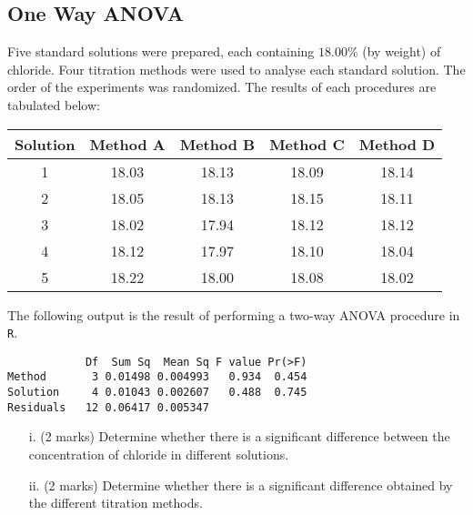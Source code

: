 \subsection{One Way ANOVA}
Five standard solutions were prepared, each containing $18.00\%$ (by weight) of chloride. Four titration methods were used to analyse each standard solution. The order of the experiments was randomized. The results of each procedures are tabulated below:
\begin{center}
    \begin{tabular}{|c|c|c|c|c|}
      \hline

      Solution &  Method A & Method B & Method C & Method D \\\hline
1	&	18.03	&	18.13	&	18.09	&	18.14	\\
2	&	18.05	&	18.13	&	18.15	&	18.11	\\
3	&	18.02	&	17.94	&	18.12	&	18.12	\\
4	&	18.12	&	17.97	&	18.10	&	18.04	\\
5	&	18.22	&	18.00	&	18.08	&	18.02	\\

      \hline
    \end{tabular}
    \end{center}
The following output is the result of performing a two-way ANOVA procedure in \texttt{R}.
\begin{framed}
\begin{verbatim}
            Df  Sum Sq  Mean Sq F value Pr(>F)
Method       3 0.01498 0.004993   0.934  0.454
Solution     4 0.01043 0.002607   0.488  0.745
Residuals   12 0.06417 0.005347
\end{verbatim}
\end{framed}




\begin{itemize}
\item[i.] (2 marks) Determine whether there is a significant difference between the concentration of chloride in different solutions.
\item[ii.] (2 marks) Determine whether there is a  significant difference obtained by the different titration methods.
\end{itemize}

